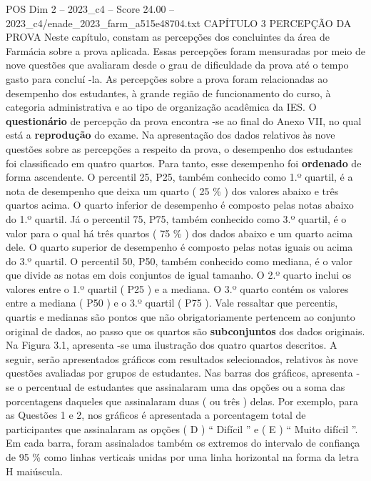 \begin{textsample}{POS Dim 2 – 2023\_c4 – Score 24.00 – 2023\_c4/enade\_2023\_farm\_a515e48704.txt}  \label{ex:f2_pos_002}
CAPÍTULO 3 PERCEPÇÃO DA PROVA Neste capítulo, constam as percepções dos concluintes da área de Farmácia sobre a prova aplicada.
Essas percepções foram mensuradas por meio de nove questões que avaliaram desde o grau de dificuldade da prova até o tempo gasto para concluí -la.
As percepções sobre a prova foram relacionadas ao desempenho dos estudantes, à grande região de funcionamento do curso, à categoria administrativa e ao tipo de organização acadêmica da IES.
O \textbf{questionário} de percepção da prova encontra -se ao final do Anexo VII, no qual está a \textbf{reprodução} do exame.
Na apresentação dos dados relativos às nove questões sobre as percepções a respeito da prova, o desempenho dos estudantes foi classificado em quatro quartos.
Para tanto, esse desempenho foi \textbf{ordenado} de forma ascendente.
O percentil 25, P25, também conhecido como 1.º quartil, é a nota de desempenho que deixa um quarto ( 25 \% ) dos valores abaixo e três quartos acima.
O quarto inferior de desempenho é composto pelas notas abaixo do 1.º quartil.
Já o percentil 75, P75, também conhecido como 3.º quartil, é o valor para o qual há três quartos ( 75 \% ) dos dados abaixo e um quarto acima dele.
O quarto superior de desempenho é composto pelas notas iguais ou acima do 3.º quartil.
O percentil 50, P50, também conhecido como mediana, é o valor que divide as notas em dois conjuntos de igual tamanho.
O 2.º quarto inclui os valores entre o 1.º quartil ( P25 ) e a mediana.
O 3.º quarto contém os valores entre a mediana ( P50 ) e o 3.º quartil ( P75 ).
Vale ressaltar que percentis, quartis e medianas são pontos que não obrigatoriamente pertencem ao conjunto original de dados, ao passo que os quartos são \textbf{subconjuntos} dos dados originais.
Na Figura 3.1, apresenta -se uma ilustração dos quatro quartos descritos.
A seguir, serão apresentados gráficos com resultados selecionados, relativos às nove questões avaliadas por grupos de estudantes.
Nas barras dos gráficos, apresenta -se o percentual de estudantes que assinalaram uma das opções ou a soma das porcentagens daqueles que assinalaram duas ( ou três ) delas.
Por exemplo, para as Questões 1 e 2, nos gráficos é apresentada a porcentagem total de participantes que assinalaram as opções ( D ) “ Difícil ” e ( E ) “ Muito difícil ”.
Em cada barra, foram assinalados também os extremos do intervalo de confiança de 95 \% como linhas verticais unidas por uma linha horizontal na forma da letra H maiúscula.

\end{textsample}
